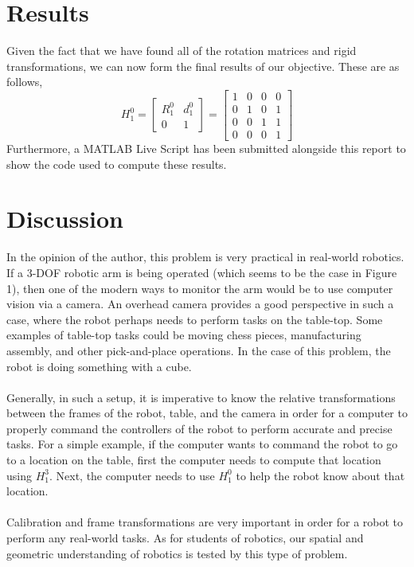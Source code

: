 \documentclass[conference]{IEEEtran}
\begin{document}
\section{Results}
Given the fact that we have found all of the rotation matrices and
rigid transformations, we can now form the final results of
our objective. These are as follows,
\[
    H^0_1 = \begin{bmatrix}
        R^0_1 & d^0_1\\
        0 & 1
    \end{bmatrix}
    = \begin{bmatrix}
        1 & 0 & 0 & 0\\
        0 & 1 & 0 & 1\\
        0 & 0 & 1 & 1\\
        0 & 0 & 0 & 1
    \end{bmatrix}
\]
Furthermore, a MATLAB Live Script has been submitted alongside
this report to show the code used to compute these results.
\section{Discussion}
In the opinion of the author, this problem is very practical
in real-world robotics. If a 3-DOF robotic arm is being operated
(which seems to be the case in Figure 1), then one of the modern 
ways to monitor the arm would be to use computer vision via a camera.
An overhead camera provides a good perspective in such a case, where
the robot perhaps needs to perform tasks on the table-top. Some examples
of table-top tasks could be moving chess pieces, manufacturing assembly,
and other pick-and-place operations. In the case of this problem, the
robot is doing something with a cube.\\
\vspace{0in}\\
Generally, in such a setup, it is imperative to know the relative transformations
between the frames of the robot, table, and the camera in order for a computer
to properly command the controllers of the robot to perform accurate and precise
tasks. For a simple example, if the computer wants to command the robot to go
to a location on the table, first the computer needs to compute that location using
$H^3_1$. Next, the computer needs to use $H^0_1$ to help the robot know about
that location.\\
\vspace{0in}\\
Calibration and frame transformations are very important in order for a robot
to perform any real-world tasks. As for students of robotics, our spatial and
geometric understanding of robotics is tested by this type of problem.


\end{document}
